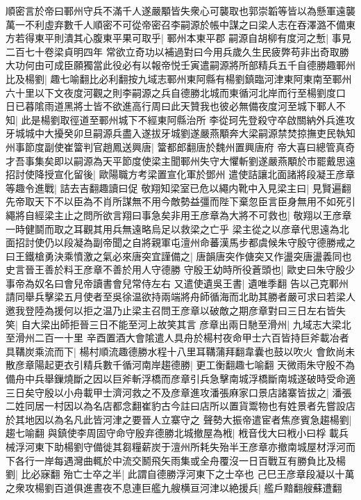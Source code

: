 順密言於帝曰鄆州守兵不滿千人遂嚴顒皆失衆心可襲取也郭崇韜等皆以為懸軍遠襲萬一不利虛弃數千人順密不可從帝密召李嗣源於帳中謀之曰梁人志在吞澤潞不備東方若得東平則潰其心腹東平果可取乎|{
	鄆州本東平郡}
嗣源自胡柳有度河之慙|{
	事見二百七十卷梁貞明四年}
常欲立奇功以補過對曰今用兵歲久生民疲弊苟非出奇取勝大功何由可成臣願獨當此役必有以報帝悦壬寅遣嗣源將所部精兵五千自德勝趣鄆州比及楊劉|{
	趣七喻翻比必利翻按九域志鄆州東阿縣有楊劉鎮臨河津東阿東南至鄆州六十里以下文夜度河觀之則李嗣源之兵自德勝北城而東循河北岸而行至楊劉度口}
日已暮隂雨道黑將士皆不欲進高行周曰此天贊我也彼必無備夜度河至城下鄆人不知|{
	此是楊劉取徑道至鄆州城下不經東阿縣治所}
李從珂先登殺守卒啟關納外兵進攻牙城城中大擾癸卯旦嗣源兵盡入遂拔牙城劉遂嚴燕顒奔大梁嗣源禁焚掠撫吏民執知州事節度副使崔簹判官趙鳳送興唐|{
	簹都郎翻唐於魏州置興唐府}
帝大喜曰總管真奇才吾事集矣即以嗣源為天平節度使梁主聞鄆州失守大懼斬劉遂嚴燕顒於市罷戴思遠招討使降授宣化留後|{
	歐陽職方考梁置宣化軍於鄧州}
遣使詰讓北面諸將段凝王彦章等趣令進戰|{
	詰去吉翻趣讀曰促}
敬翔知梁室已危以繩内靴中入見梁主曰|{
	見賢遍翻}
先帝取天下不以臣為不肖所謀無不用今敵勢益彊而陛下棄忽臣言臣身無用不如死引繩將自經梁主止之問所欲言翔曰事急矣非用王彦章為大將不可救也|{
	敬翔以王彦章一時健鬬而取之耳觀其用兵無遠略烏足以救梁之亡乎}
梁主從之以彦章代思遠為北面招討使仍以段凝為副帝聞之自將親軍屯澶州命蕃漢馬步都虞候朱守殷守德勝戒之曰王鐵槍勇決乘憤激之氣必來唐突宜謹備之|{
	唐韻唐突作傏突又作盪突唐盪義同也史言晉王善於料王彦章不善於用人守德勝}
守殷王幼時所役蒼頭也|{
	歐史曰朱守殷少事帝為奴名曰會兒帝讀書會兒常侍左右}
又遣使遺吳王書|{
	遺唯季翻}
告以己克鄆州請同舉兵擊梁五月使者至吳徐温欲持兩端將舟師循海而北助其勝者嚴可求曰若梁人邀我登陸為援何以拒之温乃止梁主召問王彦章以破敵之期彦章對曰三日左右皆失笑|{
	自大梁出師拒晉三日不能至河上故笑其言}
彦章出兩日馳至滑州|{
	九域志大梁北至滑州二百一十里}
辛酉置酒大會隂遣人具舟於楊村夜命甲士六百皆持巨斧載冶者具鞲炭乘流而下|{
	楊村順流趣德勝水程十八里耳鞲蒲拜翻韋囊也鼓以吹火}
會飲尚未散彦章陽起更衣引精兵數千循河南岸趨德勝|{
	更工衡翻趣七喻翻}
天微雨朱守殷不為備舟中兵舉鏁燒斷之因以巨斧斬浮橋而彦章引兵急擊南城浮橋斷南城遂破時受命適三日矣守殷以小舟載甲士濟河救之不及彦章進攻潘張麻家口景店諸寨皆拔之|{
	潘張二姓同居一村因以為名店都念翻崔豹古今註曰店所以置貨鬻物也有姓景者先嘗設店於其地因以為名凡此皆河津之要晉人立寨守之}
聲勢大振帝遣宦者焦彦賓急趨楊劉|{
	趨七喻翻}
與鎮使李周固守命守殷弃德勝北城撤屋為栰|{
	栰音伐大曰栰小曰桴}
載兵械浮河東下助楊劉守備徙其芻糧薪炭于澶州所耗失殆半王彦章亦撤南城屋材浮河而下各行一岸每遇灣曲輒於中流交鬭飛矢雨集或全舟覆沒一日百戰互有勝負比及楊劉|{
	比必寐翻}
殆亡士卒之半|{
	此謂自德勝浮河東下之士卒也}
己巳王彦章段凝以十萬之衆攻楊劉百道俱進晝夜不息連巨艦九艘横亘河津以絶援兵|{
	艦戶黯翻艘蘇遭翻}
